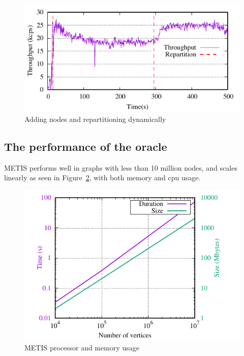 \begin{figure}[ht]
	\includegraphics{figures/experiments/dynamicload-tp-move-4p}
	\caption{Adding nodes and repartitioning dynamically}
	\label{fig:dynamic_load_tput}
\end{figure}



\subsection{The performance of the oracle}

METIS performs well in graphs with less than 10 million nodes, and
scales linearly as seen in Figure~\ref{fig:metis_size_time}, with both
memory and cpu usage.

\begin{figure}[ht!]
  \centering
    \includegraphics[width=\columnwidth]{figures/metis_size_time}
	\caption{METIS processor and memory usage}
	\label{fig:metis_size_time}
\end{figure}

